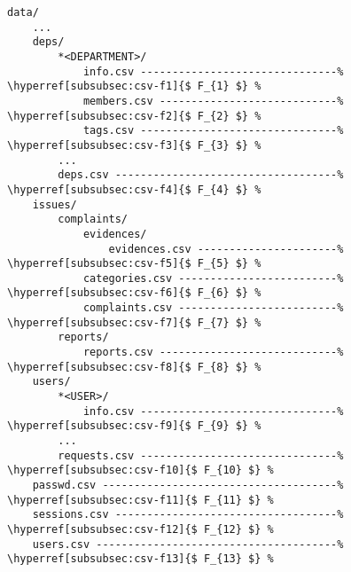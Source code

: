 \begin{lstlisting}[name={ไฟล์ CSV ใน data/ Directory},numbers=none]
data/
    ...
    deps/
        *<DEPARTMENT>/
            info.csv -------------------------------% \hyperref[subsubsec:csv-f1]{$ F_{1} $} %
            members.csv ----------------------------% \hyperref[subsubsec:csv-f2]{$ F_{2} $} %
            tags.csv -------------------------------% \hyperref[subsubsec:csv-f3]{$ F_{3} $} %
        ...
        deps.csv -----------------------------------% \hyperref[subsubsec:csv-f4]{$ F_{4} $} %
    issues/
        complaints/
            evidences/
                evidences.csv ----------------------% \hyperref[subsubsec:csv-f5]{$ F_{5} $} %
            categories.csv -------------------------% \hyperref[subsubsec:csv-f6]{$ F_{6} $} %
            complaints.csv -------------------------% \hyperref[subsubsec:csv-f7]{$ F_{7} $} %
        reports/
            reports.csv ----------------------------% \hyperref[subsubsec:csv-f8]{$ F_{8} $} %
    users/
        *<USER>/
            info.csv -------------------------------% \hyperref[subsubsec:csv-f9]{$ F_{9} $} %
        ...
        requests.csv -------------------------------% \hyperref[subsubsec:csv-f10]{$ F_{10} $} %
    passwd.csv -------------------------------------% \hyperref[subsubsec:csv-f11]{$ F_{11} $} %
    sessions.csv -----------------------------------% \hyperref[subsubsec:csv-f12]{$ F_{12} $} %
    users.csv --------------------------------------% \hyperref[subsubsec:csv-f13]{$ F_{13} $} %
\end{lstlisting}


